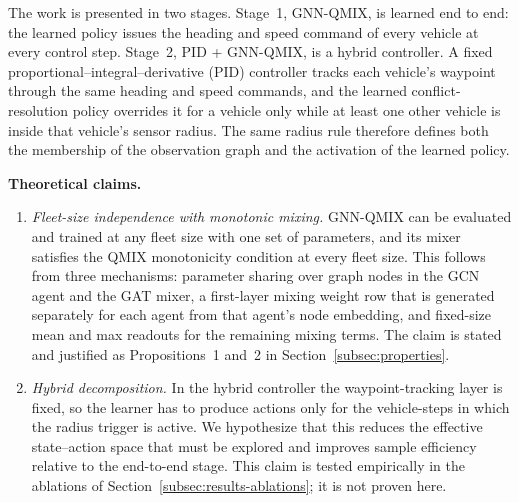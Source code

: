 The work is presented in two stages. Stage~1, GNN-QMIX, is learned end to end: the learned
policy issues the heading and speed command of every vehicle at every control step.
Stage~2, PID + GNN-QMIX, is a hybrid controller. A fixed proportional--integral--derivative
(PID) controller tracks each vehicle's waypoint through the same heading and speed commands,
and the learned conflict-resolution policy overrides it for a vehicle only while at least
one other vehicle is inside that vehicle's sensor radius. The same radius rule therefore
defines both the membership of the observation graph and the activation of the learned
policy.

\textbf{Theoretical claims.}
\begin{enumerate}
\item \emph{Fleet-size independence with monotonic mixing.} GNN-QMIX can be evaluated and
      trained at any fleet size with one set of parameters, and its mixer satisfies the
      QMIX monotonicity condition at every fleet size. This follows from three mechanisms:
      parameter sharing over graph nodes in the GCN agent and the GAT mixer, a first-layer
      mixing weight row that is generated separately for each agent from that agent's node
      embedding, and fixed-size mean and max readouts for the remaining mixing terms. The
      claim is stated and justified as Propositions~1 and~2 in Section~\ref{subsec:properties}.
\item \emph{Hybrid decomposition.} In the hybrid controller the waypoint-tracking layer is
      fixed, so the learner has to produce actions only for the vehicle-steps in which the
      radius trigger is active. We hypothesize that this reduces the effective
      state--action space that must be explored and improves sample efficiency relative to
      the end-to-end stage. This claim is tested empirically in the ablations of
      Section~\ref{subsec:results-ablations}; it is not proven here.
\end{enumerate}

